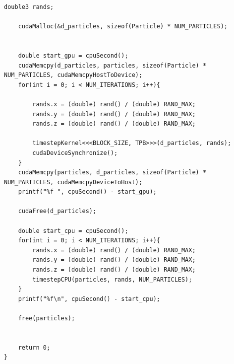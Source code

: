 \documentclass[english]{exam}
\begin{document}
\begin{lstlisting}[style=CStyle]
	double3 rands;
	
	cudaMalloc(&d_particles, sizeof(Particle) * NUM_PARTICLES);


	double start_gpu = cpuSecond();
	cudaMemcpy(d_particles, particles, sizeof(Particle) * NUM_PARTICLES, cudaMemcpyHostToDevice);
	for(int i = 0; i < NUM_ITERATIONS; i++){

		rands.x = (double) rand() / (double) RAND_MAX;
		rands.y = (double) rand() / (double) RAND_MAX;
		rands.z = (double) rand() / (double) RAND_MAX;

		timestepKernel<<<BLOCK_SIZE, TPB>>>(d_particles, rands);
		cudaDeviceSynchronize();
	}
	cudaMemcpy(particles, d_particles, sizeof(Particle) * NUM_PARTICLES, cudaMemcpyDeviceToHost);
	printf("%f ", cpuSecond() - start_gpu);
	
	cudaFree(d_particles);
	
	double start_cpu = cpuSecond();
	for(int i = 0; i < NUM_ITERATIONS; i++){
		rands.x = (double) rand() / (double) RAND_MAX;
		rands.y = (double) rand() / (double) RAND_MAX;
		rands.z = (double) rand() / (double) RAND_MAX;
		timestepCPU(particles, rands, NUM_PARTICLES);
	}
	printf("%f\n", cpuSecond() - start_cpu);

	free(particles);

	
	return 0;
}
\end{lstlisting}
\end{document}
